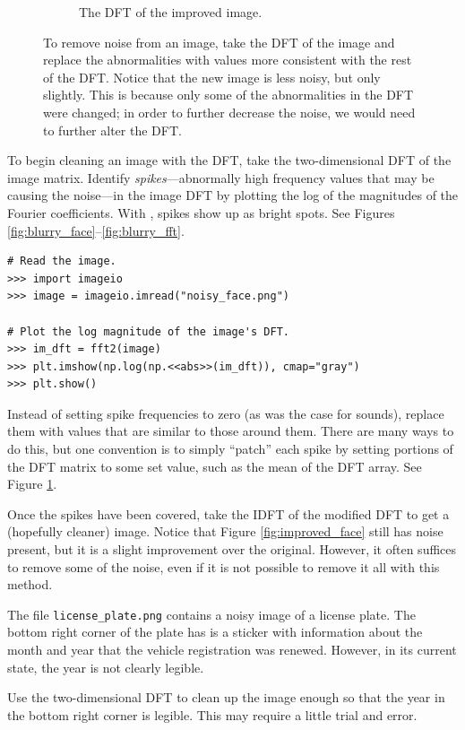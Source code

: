 \begin{figure}[H]
\begin{subfigure}{.4\textwidth}
    \caption{The DFT of the improved image.}
    \label{fig:covered_fft}
\end{subfigure}
\caption{To remove noise from an image, take the DFT of the image and replace the abnormalities with values more consistent with the rest of the DFT.
Notice that the new image is less noisy, but only slightly.
This is because only some of the abnormalities in the DFT were changed; in order to further decrease the noise, we would need to further alter the DFT.}
\label{fig:image_fft}
\end{figure}

To begin cleaning an image with the DFT, take the two-dimensional DFT of the image matrix.
Identify \emph{spikes}---abnormally high frequency values that may be causing the noise---in the image DFT by plotting the log of the magnitudes of the Fourier coefficients.
With , spikes show up as bright spots.
See Figures \ref{fig:blurry_face}--\ref{fig:blurry_fft}.

\begin{lstlisting}
# Read the image.
>>> import imageio
>>> image = imageio.imread("noisy_face.png")

# Plot the log magnitude of the image's DFT.
>>> im_dft = fft2(image)
>>> plt.imshow(np.log(np.<<abs>>(im_dft)), cmap="gray")
>>> plt.show()
\end{lstlisting}

Instead of setting spike frequencies to zero (as was the case for sounds), replace them with values that are similar to those around them.
There are many ways to do this, but one convention is to simply ``patch'' each spike by setting portions of the DFT matrix to some set value, such as the mean of the DFT array.
See Figure \ref{fig:covered_fft}.

Once the spikes have been covered, take the IDFT of the modified DFT to get a (hopefully cleaner) image.
Notice that Figure \ref{fig:improved_face} still has noise present, but it is a slight improvement over the original.
However, it often suffices to remove some of the noise, even if it is not possible to remove it all with this method.

\begin{problem} %
The file \texttt{license\_plate.png} contains a noisy image of a license plate.
The bottom right corner of the plate has is a sticker with information about the month and year that the vehicle registration was renewed.
However, in its current state, the year is not clearly legible.

Use the two-dimensional DFT to clean up the image enough so that the year in the bottom right corner is legible.
This may require a little trial and error.
\end{problem}

